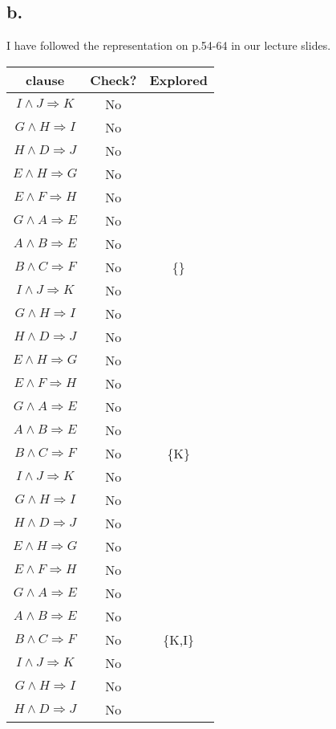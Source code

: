 \documentclass[12pt]{article}
\begin{document}
\subsection*{b.}
I have followed the representation on p.54-64 in our lecture slides.
\begin{table}[H]
\small
\centering
\label{table:example}
\begin{tabular}
{|c|c|c|}	%
\hline 							%
\textbf{clause} & \textbf{Check?} & \textbf{Explored}\\
\hline
$I \wedge J \Rightarrow K$ & No &\\
$G \wedge H \Rightarrow I$ & No &\\
$H \wedge D \Rightarrow J$ & No &\\
$E \wedge H \Rightarrow G$ & No &\\
$E \wedge F \Rightarrow H$ & No &\\
$G \wedge A \Rightarrow E$ & No &\\
$A \wedge B \Rightarrow E$ & No &\\
$B \wedge C \Rightarrow F$ & No &\{\}\\
\hline
$I \wedge J \Rightarrow K$ & No &\\
$G \wedge H \Rightarrow I$ & No &\\
$H \wedge D \Rightarrow J$ & No &\\
$E \wedge H \Rightarrow G$ & No &\\
$E \wedge F \Rightarrow H$ & No &\\
$G \wedge A \Rightarrow E$ & No &\\
$A \wedge B \Rightarrow E$ & No &\\
$B \wedge C \Rightarrow F$ & No & \{K\}\\
\hline
$I \wedge J \Rightarrow K$ & No &\\
$G \wedge H \Rightarrow I$ & No &\\
$H \wedge D \Rightarrow J$ & No &\\
$E \wedge H \Rightarrow G$ & No &\\
$E \wedge F \Rightarrow H$ & No &\\
$G \wedge A \Rightarrow E$ & No &\\
$A \wedge B \Rightarrow E$ & No &\\
$B \wedge C \Rightarrow F$ & No & \{K,I\}\\
\hline
$I \wedge J \Rightarrow K$ & No &\\
$G \wedge H \Rightarrow I$ & No &\\
$H \wedge D \Rightarrow J$ & No &\\

\end{tabular}
\end{table}
\end{document}
